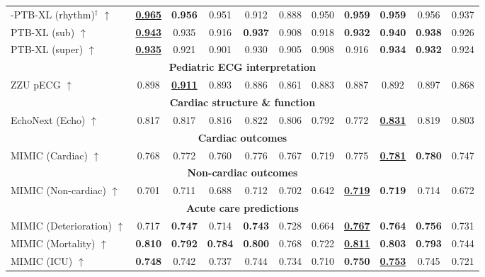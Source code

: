 \documentclass{article}
\begin{document}
\begin{table}[t]
\begin{tabular}{lcccccccccc}
                    -PTB-XL (rhythm)${}^\dagger$ $\uparrow$ & \underline{\textbf{0.965}} & \textbf{0.956} & 0.951 & 0.912 & 0.888 & 0.950 & \textbf{0.959} & \textbf{0.959} & 0.956 & 0.937 \\
                    PTB-XL (sub) $\uparrow$ & \underline{\textbf{0.943}} & 0.935 & 0.916 & \textbf{0.937} & 0.908 & 0.918 & \textbf{0.932} & \textbf{0.940} & \textbf{0.938} & 0.926 \\
                    PTB-XL (super) $\uparrow$ & \underline{\textbf{0.935}} & 0.921 & 0.901 & 0.930 & 0.905 & 0.908 & 0.916 & \textbf{0.934} & \textbf{0.932} & 0.924 \\
                    \midrule
                    
                    \multicolumn{11}{c}{\textbf{Pediatric ECG interpretation }} \\
                    ZZU pECG $\uparrow$ & 0.898 & \underline{\textbf{0.911}} & 0.893 & 0.886 & 0.861 & 0.883 & 0.887 & 0.892 & 0.897 & 0.868 \\
                    \midrule
        
                    \multicolumn{11}{c}{\textbf{Cardiac structure \& function }} \\
                    EchoNext (Echo) $\uparrow$ & 0.817 & 0.817 & 0.816 & 0.822 & 0.806 & 0.792 & 0.772 & \underline{\textbf{0.831}} & 0.819 & 0.803 \\
                    \midrule
                    
                    \multicolumn{11}{c}{\textbf{Cardiac outcomes}} \\
                    MIMIC (Cardiac) $\uparrow$ & 0.768 & 0.772 & 0.760 & 0.776 & 0.767 & 0.719 & 0.775 & \textbf{\underline{0.781}} & \textbf{0.780} & 0.747 \\
                    \midrule
                    
                    \multicolumn{11}{c}{\textbf{Non-cardiac outcomes}} \\
                    MIMIC (Non-cardiac) $\uparrow$ & 0.701 & 0.711 & 0.688 & 0.712 & 0.702 & 0.642 & \textbf{\underline{0.719}} & \textbf{0.719} & 0.714 & 0.672 \\
                    \midrule
                    
                    \multicolumn{11}{c}{\textbf{Acute care predictions}} \\
                    MIMIC (Deterioration) $\uparrow$ & 0.717 & \textbf{0.747} & 0.714 & \textbf{0.743} & 0.728 & 0.664 & \textbf{\underline{0.767}} & \textbf{0.764} & \textbf{0.756} & 0.731 \\
                    MIMIC (Mortality) $\uparrow$ & \textbf{0.810} & \textbf{0.792} & \textbf{0.784} & \textbf{0.800} & 0.768 & 0.722 & \textbf{\underline{0.811}} & \textbf{0.803} & \textbf{0.793} & 0.744 \\
                    MIMIC (ICU) $\uparrow$ & \textbf{0.748} & 0.742 & 0.737 & 0.744 & 0.734 & 0.710 & \textbf{0.750} & \textbf{\underline{0.753}} & 0.745 & 0.721 \\
                    \midrule
                    

\end{tabular}
\end{table}
\end{document}
